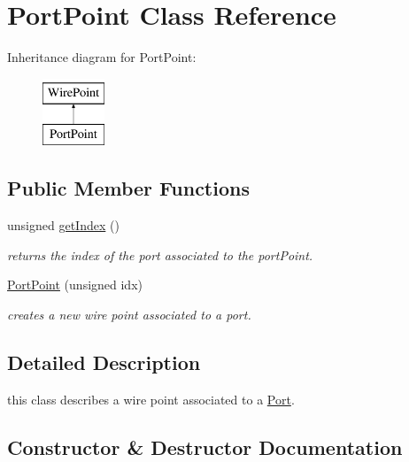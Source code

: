 \hypertarget{class_open_chams_1_1_port_point}{}\section{Port\+Point Class Reference}
\label{class_open_chams_1_1_port_point}
Inheritance diagram for Port\+Point\+:\begin{figure}[H]
\begin{center}
\leavevmode
\includegraphics[height=2.000000cm]{class_open_chams_1_1_port_point}
\end{center}
\end{figure}
\subsection*{Public Member Functions}
\begin{DoxyCompactItemize}
\item 
\mbox{\label{class_open_chams_1_1_port_point_ab4018980dcd1fed5208e7a72846cd815}} 
unsigned \hyperlink{class_open_chams_1_1_port_point_ab4018980dcd1fed5208e7a72846cd815}{get\+Index} ()
\begin{DoxyCompactList}\small\item\em returns the index of the port associated to the port\+Point. \end{DoxyCompactList}\item 
\hyperlink{class_open_chams_1_1_port_point_aaa11e5ede2581539ec666941e1c86fc3}{Port\+Point} (unsigned idx)
\begin{DoxyCompactList}\small\item\em creates a new wire point associated to a port. \end{DoxyCompactList}\end{DoxyCompactItemize}


\subsection{Detailed Description}
this class describes a wire point associated to a \hyperlink{class_open_chams_1_1_port}{Port}. 

\subsection{Constructor \& Destructor Documentation}
\mbox{\label{class_open_chams_1_1_port_point_aaa11e5ede2581539ec666941e1c86fc3}} 

